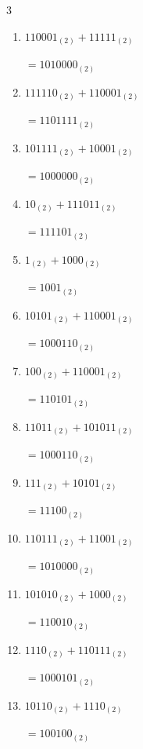 \begin{multicols}{3}
\begin{enumerate}
        $=1000001_{(2)}$

\columnbreak %

  \item $110001_{(2)} + 11111_{(2)}$

        $=1010000_{(2)}$

  \item $111110_{(2)} + 110001_{(2)}$

        $=1101111_{(2)}$

  \item $101111_{(2)} + 10001_{(2)}$

        $=1000000_{(2)}$

  \item $10_{(2)} + 111011_{(2)}$

        $=111101_{(2)}$

  \item $1_{(2)} + 1000_{(2)}$

        $=1001_{(2)}$

  \item $10101_{(2)} + 110001_{(2)}$

        $=1000110_{(2)}$

  \item $100_{(2)} + 110001_{(2)}$

        $=110101_{(2)}$

  \item $11011_{(2)} + 101011_{(2)}$

        $=1000110_{(2)}$

  \item $111_{(2)} + 10101_{(2)}$

        $=11100_{(2)}$

  \item $110111_{(2)} + 11001_{(2)}$

        $=1010000_{(2)}$

\columnbreak %

\resetques

  \item $101010_{(2)} + 1000_{(2)}$

        $=110010_{(2)}$

  \item $1110_{(2)} + 110111_{(2)}$

        $=1000101_{(2)}$

  \item $10110_{(2)} + 1110_{(2)}$

        $=100100_{(2)}$


\end{enumerate}
\end{multicols}
